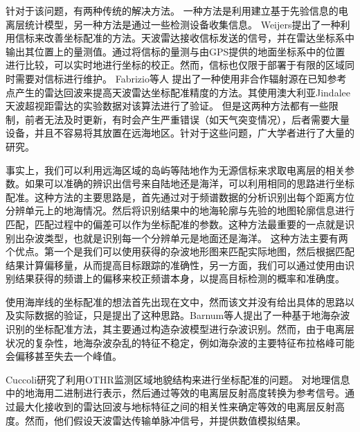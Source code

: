 针对于该问题，有两种传统的解决方法。
一种方法是利用建立基于先验信息的电离层统计模型，另一种方法是通过一些检测设备收集信息。
Weijers\cite{weijers1995oth}提出了一种利用信标来改善坐标配准的方法。天波雷达接收信标发送的信号，并在雷达坐标系中输出其位置上的量测值。通过将信标的量测与由GPS提供的地面坐标系中的位置进行比较，可以实时地进行坐标的校正。然而，信标也仅限于部署于有限的区域同时需要对信标进行维护。
Fabrizio等人\cite{fabrizio2016using} 提出了一种使用非合作辐射源在已知参考点产生的雷达回波来提高天波雷达坐标配准精度的方法。其使用澳大利亚Jindalee天波超视距雷达的实验数据对该算法进行了验证。
但是这两种方法都有一些限制，前者无法及时更新，有时会产生严重错误（如天气突变情况），后者需要大量设备，并且不容易将其放置在远海地区。针对于这些问题，广大学者进行了大量的研究。

事实上，我们可以利用远海区域的岛屿等陆地作为无源信标来求取电离层的相关参数。如果可以准确的辨识出信号来自陆地还是海洋，可以利用相同的思路进行坐标配准。这种方法的主要思路是，首先通过对于频谱数据的分析识别出每个距离方位分辨单元上的地海情况。然后将识别结果中的地海轮廓与先验的地图轮廓信息进行匹配，匹配过程中的偏差可以作为坐标配准的参数。这种方法最重要的一点就是识别出杂波类型，也就是识别每一个分辨单元是地面还是海洋。
这种方法主要有两个优点。第一个是我们可以使用获得的杂波地形图来匹配实际地图，然后根据匹配结果计算偏移量，从而提高目标跟踪的准确性，另一方面，我们可以通过使用由识别结果获得的频谱上的偏移来校正频谱本身，以提高目标检测的概率和准确度。

使用海岸线的坐标配准的想法首先出现在文\cite{wheadon1994ionospheric, anderson1995auto}中，然而该文并没有给出具体的思路以及实际数据的验证，只是提出了这种思路。Barnum等人\cite{barnum1998over}提出了一种基于地海杂波识别的坐标配准方法，其主要通过构造杂波模型进行杂波识别。然而，由于电离层状况的复杂性，地海杂波杂乱的特征不稳定，例如海杂波的主要特征布拉格峰可能会偏移甚至失去一个峰值。

Cuccoli\cite{cuccoli2009over, cuccoli2009over2, cuccoli2010sea, cuccoli2011coordinate}研究了利用OTHR监测区域地貌结构来进行坐标配准的问题。
对地理信息中的地海用二进制进行表示，然后通过等效的电离层反射高度转换为参考信号。通过最大化接收到的雷达回波与地标特征之间的相关性来确定等效的电离层反射高度。然而，他们假设天波雷达传输单脉冲信号，并提供数值模拟结果。

